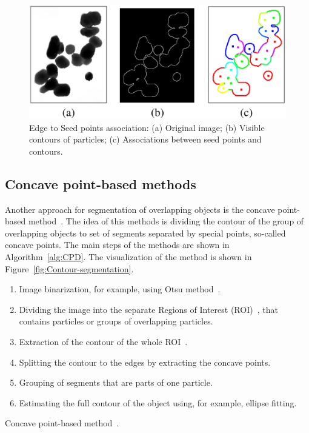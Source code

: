 \documentclass{lutmscthesis}[2010/09/22]
\begin{document}
\begin{figure} [ht]
  \includegraphics[width=\linewidth]{edge-to-seed-points.png}
  \caption{Edge to Seed points association: 
        (a) Original image; 
        (b) Visible contours of particles; 
        (c) Associations between seed points and contours.~\cite{BE-FRS}
    }
  \label{fig:seed-point-assoc}
\end{figure}

\subsection{Concave point-based methods}
Another approach for segmentation of overlapping objects is the concave point-based method~\cite{compare-cpd,Saddik,Zafari15}. The idea of this methods is dividing the contour of the group of overlapping objects to set of segments separated by special points, so-called concave points. The main steps of the methods are shown in Algorithm~\ref{alg:CPD}. The visualization of the method is shown in Figure~\ref{fig:Contour-segmentation}.

\begin{algorithm} [H]
    \begin{enumerate}
        \item Image binarization, for example, using Otsu method~\cite{otsu}.
        \item Dividing the image into the separate Regions of Interest (ROI)~, that contains particles or groups of overlapping particles.
        \item Extraction of the contour of the whole ROI~\cite{ROI}.
        \item Splitting the contour to the edges by extracting the concave points.
        \item Grouping of segments that are parts of one particle.
        \item Estimating the full contour of the object using, for example, ellipse fitting.
    \end{enumerate}
    \caption{Concave point-based method~\cite{Zafari15}.}\label{alg:CPD}
\end{algorithm}
\end{document}
